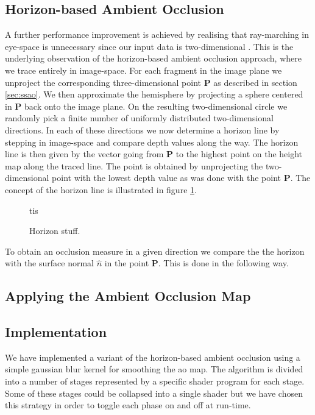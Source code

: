 \subsection{Horizon-based Ambient Occlusion}
A further performance improvement is achieved by realising that
ray-marching in eye-space is unnecessary since our input data is
two-dimensional \citep{hbao}. This is the underlying observation of
the horizon-based ambient occlusion approach, where we trace entirely
in image-space. For each fragment in the image plane we unproject the
corresponding three-dimensional point $\mathbf{P}$ as described in
section \ref{sec:ssao}. We then approximate the hemisphere by
projecting a sphere centered in $\mathbf{P}$ back onto the image
plane. On the resulting two-dimensional circle we randomly pick a
finite number of uniformly distributed two-dimensional directions. In
each of these directions we now determine a horizon line by stepping
in image-space and compare depth values along the way. The horizon
line is then given by the vector going from $\mathbf{P}$ to the
highest point on the height map along the traced line. The point is
obtained by unprojecting the two-dimensional point with the lowest
depth value as was done with the point $\mathbf{P}$. The concept of
the horizon line is illustrated in figure \ref{fig:horizon}.
\begin{figure}[h]
  \centering
  tis
  \caption{Horizon stuff.}
  \label{fig:horizon}
\end{figure}
To obtain an occlusion measure in a given direction we compare the
the horizon with the surface normal $\hat{n}$ in the point
$\mathbf{P}$. This is done in the following way.

\subsection{Applying the Ambient Occlusion Map}

\subsection{Implementation}

We have implemented a variant of the horizon-based ambient occlusion
using a simple gaussian blur kernel for smoothing the ao map.  The
algorithm is divided into a number of stages represented by a specific
shader program for each stage. Some of these stages could be collapsed
into a single shader but we have chosen this strategy in order to
toggle each phase on and off at run-time.

